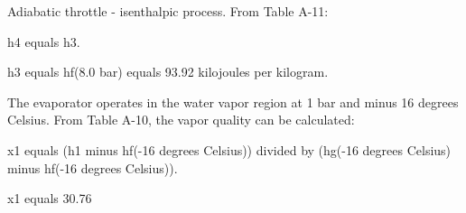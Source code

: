 Adiabatic throttle - isenthalpic process. From Table A-11:

h4 equals h3.

h3 equals hf(8.0 bar) equals 93.92 kilojoules per kilogram.

The evaporator operates in the water vapor region at 1 bar and minus 16 degrees Celsius. From Table A-10, the vapor quality can be calculated:

x1 equals (h1 minus hf(-16 degrees Celsius)) divided by (hg(-16 degrees Celsius) minus hf(-16 degrees Celsius)).

x1 equals 30.76%